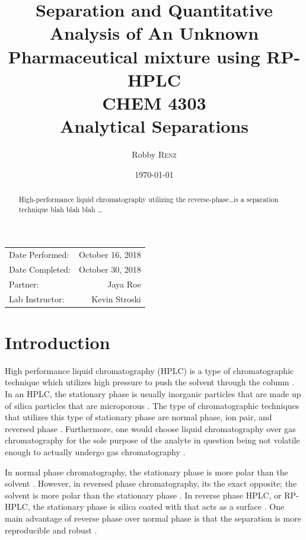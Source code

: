 \documentclass[a4paper, 12pt]{article}
\title{Separation and Quantitative Analysis of An Unknown Pharmaceutical mixture using RP-HPLC \\ CHEM 4303 \\ Analytical Separations} %
\author{Robby \textsc{Renz}} %
\date{\today} %
\begin{document}
\maketitle %

\begin{center}
\begin{tabular}{l r}
Date Performed: & October 16, 2018 \\ %
Date Completed: & October 30, 2018 \\
Partner: & Jaya Roe \\ %
Lab Instructor: & Kevin Stroski %
\end{tabular}
\end{center}


\begin{abstract}
	High-performance liquid chromatography utilizing the reverse-phase\dots{}is a separation technique blah blah blah \dots
\end{abstract}
\newpage


\section{Introduction}
High performance liquid chromatography (HPLC) is a type of chromatographic technique which utilizes high pressure to push the solvent through the column \cite{harris}. In an HPLC, the stationary phase is usually inorganic particles that are made up of silica particles that are microporous \cite{harris}. The type of chromatographic techniques that utilizes this type of stationary phase are normal phase, ion pair, and reversed phase \cite{mold}. Furthermore, one would choose liquid chromatography over gas chromatography for the sole purpose of the analyte in question being not volatile enough to actually undergo gas chromatography \cite{harris}.

In normal phase chromatography, the stationary phase is more polar than the solvent \cite{harris}. However, in reversed phase chromatography, its the exact opposite; the solvent is more polar than the stationary phase \cite{harris}. In reverse phase HPLC, or RP-HPLC, the stationary phase is silica coated with  that acts as a surface \cite{fanali_liquid_2013}. One main advantage of reverse phase over normal phase is that the separation is more reproducible and robust \cite{fanali_liquid_2013}.
\end{document}
